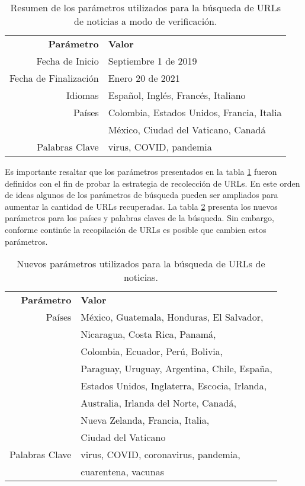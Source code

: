 \begin{table}[h]
    \centering
    \begin{tabular}{r|l}
        \textbf{Parámetro} & \textbf{Valor} \\
        Fecha de Inicio & Septiembre 1 de 2019 \\
        Fecha de Finalización & Enero 20 de 2021 \\
        Idiomas & Español, Inglés, Francés, Italiano \\
        Países & Colombia, Estados Unidos, Francia, Italia \\
        & México, Ciudad del Vaticano, Canadá \\
        Palabras Clave & virus, COVID, pandemia
    \end{tabular}
    \caption{Resumen de los parámetros utilizados para la búsqueda de URLs de noticias a modo de verificación.}
    \label{tab:news_parameters}
\end{table}

Es importante resaltar que los parámetros presentados en la tabla \ref{tab:news_parameters} fueron definidos con el fin de probar la estrategia de recolección de URLs. En este orden de ideas algunos de los parámetros de búsqueda pueden ser ampliados para aumentar la cantidad de URLs recuperadas. La tabla \ref{tab:news_final_parameters} presenta los nuevos parámetros para los países y palabras claves de la búsqueda. Sin embargo, conforme continúe la recopilación de URLs es posible que cambien estos parámetros.

\begin{table}[h]
    \centering
    \begin{tabular}{r|l}
        \textbf{Parámetro} & \textbf{Valor} \\
        Países  & México, Guatemala, Honduras, El Salvador, \\
                & Nicaragua, Costa Rica, Panamá, \\
                & Colombia, Ecuador, Perú, Bolivia, \\
                & Paraguay, Uruguay, Argentina, Chile, España, \\
                & Estados Unidos, Inglaterra, Escocia, Irlanda, \\
                & Australia, Irlanda del Norte, Canadá, \\
                & Nueva Zelanda, Francia, Italia, \\
                & Ciudad del Vaticano \\
        Palabras Clave & virus, COVID, coronavirus, pandemia, \\
                & cuarentena, vacunas \\
    \end{tabular}
    \caption{Nuevos parámetros utilizados para la búsqueda de URLs de noticias.}
    \label{tab:news_final_parameters}
\end{table}

